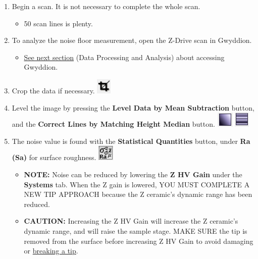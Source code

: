 \documentclass{../lab}
\begin{document}
\begin{enumerate}
    \item Begin a scan.  It is not necessary to complete the whole scan.
    \begin{itemize}
        \item 50 scan lines is plenty.
    \end{itemize}

    \item To analyze the noise floor measurement, open the Z-Drive scan in Gwyddion.
    \begin{itemize}
        \item \hyperref[sec:DataProcessingAndAnalysis]{See next section} (Data Processing and Analysis) about accessing Gwyddion.
    \end{itemize}

    \item Crop the data if necessary. \includegraphics[height=2em]{images/33.png}

    \item Level the image by pressing the \textbf{Level Data by Mean Subtraction} button, and the \textbf{Correct Lines by Matching Height Median} button. \includegraphics[height=2em]{images/34.png} \includegraphics[height=2em]{images/35.png}

    \item The noise value is found with the\textbf{ Statistical Quantities} button, under \textbf{Ra (Sa)} for surface roughness. \includegraphics[height=2em]{images/36.png}
    \begin{itemize}
        \item \textbf{NOTE: }Noise can be reduced by lowering the \textbf{Z HV Gain} under the \textbf{Systems} tab.  When the Z gain is lowered, YOU MUST COMPLETE A NEW TIP APPROACH because the Z ceramic's dynamic range has been reduced.
        
        \item \textbf{CAUTION: }Increasing the Z HV Gain will increase the Z ceramic's dynamic range, and will raise the sample stage.  MAKE SURE the tip is removed from the surface before increasing Z HV Gain to avoid damaging or \hyperref[subsec:BrokenTip]{breaking a tip}.
    \end{itemize}

\end{enumerate}
\end{document}
